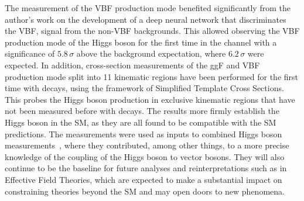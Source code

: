 The measurement of the VBF production mode benefited significantly from the author's work on the development of a deep neural network that discriminates the VBF, \HWW signal from the non-VBF backgrounds. 
This allowed observing the VBF production mode of the Higgs boson for the first time in the \HWW channel with a significance of $5.8\,\sigma$ above the background expectation, where $6.2\,\sigma$ were expected.
In addition, cross-section measurements of the ggF and VBF production mode split into 11 kinematic regions have been performed for the first time with \HWW decays, using the framework of Simplified Template Cross Sections. This probes the Higgs boson production in exclusive kinematic regions that have not been measured before with \HWW decays.
The results more firmly establish the Higgs boson in the SM, as they are all found to be compatible with the SM predictions.
The measurements were used as inputs to combined Higgs boson measurements~\cite{NaturePaper}, where they contributed, among other things, to a more precise knowledge of the coupling of the Higgs boson to vector bosons. 
They will also continue to be the baseline for future analyses and reinterpretations such as in Effective Field Theories, which are expected to make a substantial impact on constraining theories beyond the SM and may open doors to new phenomena.


